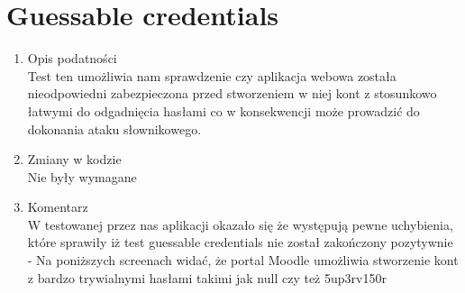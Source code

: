 \section{Guessable credentials}
\begin{enumerate}
\item Opis podatności\\
Test ten umożliwia nam sprawdzenie czy aplikacja webowa została nieodpowiedni zabezpieczona przed stworzeniem w niej kont z stosunkowo łatwymi do odgadnięcia hasłami co w konsekwencji może prowadzić do dokonania ataku słownikowego.
\item Zmiany w kodzie\\
Nie były wymagane
\item Komentarz\\
W testowanej przez nas aplikacji okazało się że występują pewne uchybienia, które sprawiły iż test guessable credentials nie został zakończony pozytywnie - Na poniższych screenach widać, że portal Moodle umożliwia stworzenie kont z bardzo trywialnymi hasłami takimi jak null  czy też 5up3rv150r

\noindent
\begin{minipage}{\linewidth}
\label{erd}
\end{minipage}

\noindent
\begin{minipage}{\linewidth}
\label{erd}
\end{minipage}


\end{enumerate}
